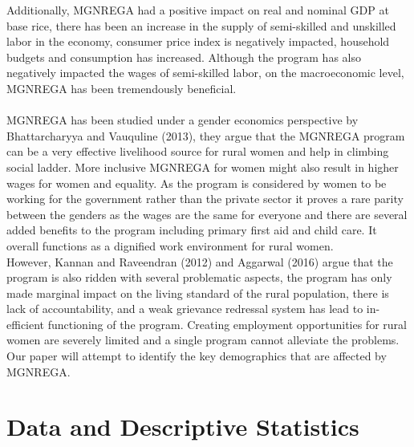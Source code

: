 \documentclass{article}
\begin{document}
Additionally, MGNREGA had a positive impact on real and nominal GDP at base rice, there has been an increase in the supply of semi-skilled and unskilled labor in the economy, consumer price index is negatively impacted, household budgets  and consumption has increased. Although the program has also negatively impacted the wages of semi-skilled labor, on the macroeconomic level, MGNREGA has been tremendously beneficial.
\\
\\
MGNREGA has been studied under a gender economics perspective by Bhattarcharyya and Vauquline (2013), they argue that the MGNREGA program can be a very effective livelihood source for rural women and help in climbing social ladder. More inclusive MGNREGA for women might also result in higher wages for women and equality. As the program is considered by women to be working for the government rather than the private sector it proves a rare parity between the genders as the wages are the same for everyone and there are several added benefits to the program including primary first aid and child care. It overall functions as a dignified work environment for rural women.
\\
However, Kannan and Raveendran (2012) and Aggarwal (2016) argue that the program is also ridden with several problematic aspects, the program has only made marginal impact on the living standard of the rural population, there is lack of accountability, and a weak grievance redressal system has lead to in-efficient functioning of the program. Creating employment opportunities for rural women are severely limited and a single program cannot alleviate the problems. Our paper will attempt to identify the key demographics that are affected by MGNREGA.

\section{Data and Descriptive Statistics}
\label{data}
\end{document}
